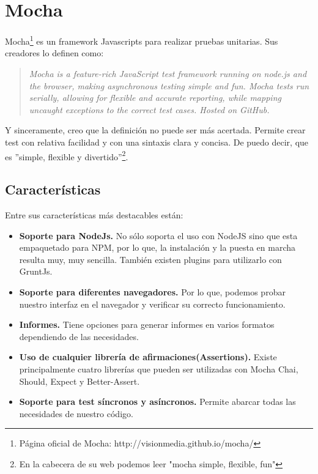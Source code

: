 
\section{Mocha}

Mocha\footnote{Página oficial de Mocha: http://visionmedia.github.io/mocha/} es un framework Javascripts para realizar pruebas unitarias. Sus creadores lo definen como:

\begin{quote}
\textit{Mocha is a feature-rich JavaScript test framework running on node.js and the browser, making asynchronous testing simple and fun. Mocha tests run serially, allowing for flexible and accurate reporting, while mapping uncaught exceptions to the correct test cases. Hosted on GitHub.}
\end{quote}


Y sinceramente, creo que la definición no puede ser más acertada. Permite crear test con relativa facilidad y con una sintaxis clara y concisa. De puedo decir, que es ''simple, flexible y divertido''\footnote{En la cabecera de su web podemos leer "mocha simple, flexible, fun"}.


\subsection{Características}

Entre sus características más destacables están:


\begin{itemize}
\item \textbf{Soporte para NodeJs.} No sólo soporta el uso con NodeJS sino que esta empaquetado para NPM, por lo que, la instalación y la puesta en marcha resulta muy, muy sencilla. También existen plugins para utilizarlo con GruntJs.
\item \textbf{Soporte para diferentes navegadores.} Por lo que, podemos probar nuestro interfaz en el navegador y verificar su correcto funcionamiento.
\item \textbf{Informes.} Tiene opciones para generar informes en varios formatos dependiendo de las necesidades.
\item \textbf{Uso de cualquier librería de afirmaciones(Assertions).} Existe principalmente cuatro librerías que pueden ser utilizadas con Mocha Chai, Should, Expect y Better-Assert.
\item \textbf{Soporte para test síncronos y asíncronos.} Permite abarcar todas las necesidades de nuestro código.
\end{itemize}

